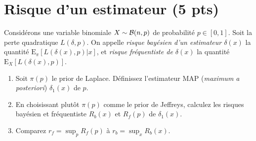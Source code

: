 \documentclass[10pt]{article}
\newcommand{\E}{\mbox{E}}
\newcommand{\1}{\mathbbm{1}}
\begin{document}
\section{Risque d'un estimateur (5 pts)}

Consid\'erons une variable binomiale $X\sim{\cal{B}}(n,p)$ de probabilit\'e $p\in[0,1]$. Soit la perte quadratique $L(\delta,p)$. On appelle {\it risque bay\'esien d'un estimateur $\delta(x)$} la quantit\'e $\E_{\pi}[L(\delta(x),p)|x]$, et  {\it risque fr\'equentiste de $\delta(x)$}  la quantit\'e $\E_{X}[L(\delta(x),p)]$.
\begin{enumerate}
\item Soit $\pi(p)$ le prior de Laplace. D\'efinissez l'estimateur MAP ({\it maximum a posteriori}) $\delta_1(x)$ de $p$.
\item En choisissant plut\^ot $\pi(p)$ comme le prior de Jeffreys, calculez les risques bay\'esien et fr\'equentiste $R_b(x)$ et $R_f(p)$ de  $\delta_1(x)$.
\item Comparez $r_f = \sup_p R_f(p)$ \`a 
$r_b  =  \sup_x R_b(x)$. 
\end{enumerate}
\end{document}
